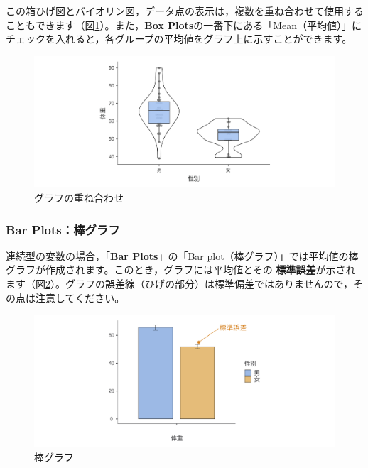 \documentclass[
  12pt,
  a5jpaper,
  lualatex, ja=standard]{bxjsbook}
\renewcommand{\emph}[1]{\textbf{\color{emph} #1}}
\begin{document}
この箱ひげ図とバイオリン図，データ点の表示は，複数を重ね合わせて使用することもできます（図\ref{fig:Exploration-descriptives-plots-box-combined}）。また，\textbf{Box Plots}の一番下にある「Mean（平均値）」にチェックを入れると，各グループの平均値をグラフ上に示すことができます。

\begin{figure}[!ht]

{\centering \includegraphics[width=1\linewidth]{images/exploration/Exploration-descriptives-plots-box-combined} 

}

\caption{グラフの重ね合わせ}\label{fig:Exploration-descriptives-plots-box-combined}
\end{figure}

\clearpage

\hypertarget{subsubsub:exp-plots-bar}{%
\subsubsection*{Bar Plots：棒グラフ}\label{subsubsub:exp-plots-bar}}

連続型の変数の場合，「\textbf{Bar Plots}」の「Bar plot（棒グラフ）」では平均値の棒グラフが作成されます。このとき，グラフには平均値とその\emph{標準誤差}が示されます（図\ref{fig:Exploration-descriptives-plots-bar}）。グラフの誤差線（ひげの部分）は標準偏差ではありませんので，その点は注意してください。

\begin{figure}[!ht]

{\centering \includegraphics[width=1\linewidth]{images/exploration/Exploration-descriptives-plots-bar} 

}

\caption{棒グラフ}\label{fig:Exploration-descriptives-plots-bar}
\end{figure}
\end{document}
